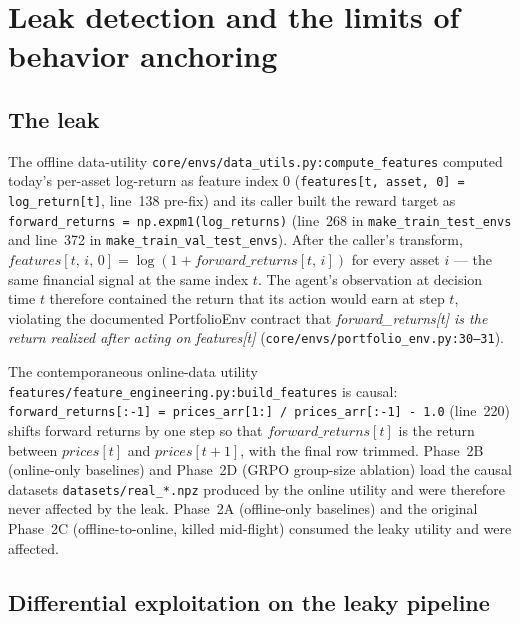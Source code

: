 
\section{Leak detection and the limits of behavior anchoring}
\label{app:leak}

\subsection{The leak}
\label{app:leak:bug}

The offline data-utility \texttt{core/envs/data\_utils.py:compute\_features}
computed today's per-asset log-return as feature index $0$
(\texttt{features[t,\,asset,\,0] = log\_return[t]}, line~138 pre-fix) and
its caller built the reward target as \texttt{forward\_returns =
np.expm1(log\_returns)} (line~268 in \texttt{make\_train\_test\_envs}
and line~372 in \texttt{make\_train\_val\_test\_envs}). After the
caller's transform, $\mathit{features}[t,\,i,\,0] = \log(1 +
\mathit{forward\_returns}[t,\,i])$ for every asset $i$ --- the same
financial signal at the same index $t$. The agent's observation at
decision time $t$ therefore contained the return that its action would
earn at step $t$, violating the documented PortfolioEnv contract that
\textit{forward\_returns[t] is the return realized after acting on
features[t]} (\texttt{core/envs/portfolio\_env.py:30--31}).

The contemporaneous online-data utility
\texttt{features/feature\_engineering.py:build\_features} is causal:
\texttt{forward\_returns[:-1] = prices\_arr[1:] / prices\_arr[:-1] -
1.0} (line~220) shifts forward returns by one step so that
$\mathit{forward\_returns}[t]$ is the return between $\mathit{prices}[t]$
and $\mathit{prices}[t+1]$, with the final row trimmed. Phase~2B
(online-only baselines) and Phase~2D (GRPO group-size ablation) load
the causal datasets \texttt{datasets/real\_*.npz} produced by the
online utility and were therefore never affected by the leak. Phase~2A
(offline-only baselines) and the original Phase~2C (offline-to-online,
killed mid-flight) consumed the leaky utility and were affected.

\subsection{Differential exploitation on the leaky pipeline}
\label{app:leak:differential}


